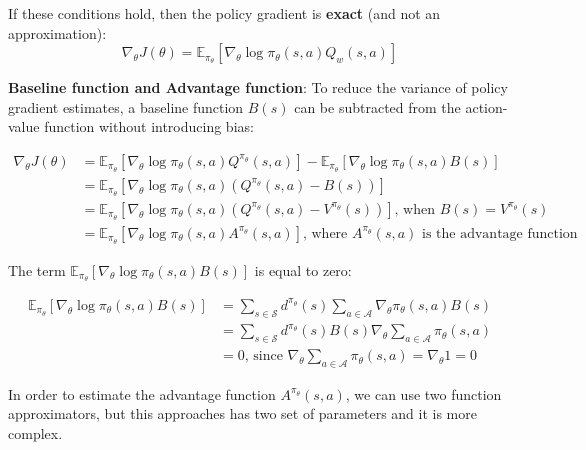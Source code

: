 \noindent If these conditions hold, then the policy gradient is \textbf{exact} (and not an approximation):
\[
    \nabla_\theta J(\theta) = \mathbb{E}_{\pi_\theta}[\nabla_\theta \log \pi_\theta(s,a) Q_w(s,a)]
\]

\noindent \textbf{Baseline function and Advantage function}: To reduce the variance of policy
gradient estimates, a baseline function $B(s)$ can be subtracted from the
action-value function without introducing bias:

\begin{align*}
    \nabla_\theta J(\theta) & = \mathbb{E}_{\pi_\theta}[\nabla_\theta \log \pi_\theta(s,a) Q^{\pi_\theta}(s,a)] - \mathbb{E}_{\pi_\theta}[\nabla_\theta \log \pi_\theta(s,a) B(s)]    \\
                            & = \mathbb{E}_{\pi_\theta}[\nabla_\theta \log \pi_\theta(s,a) (Q^{\pi_\theta}(s,a) - B(s))]                                                              \\
                            & = \mathbb{E}_{\pi_\theta}[\nabla_\theta \log \pi_\theta(s,a) (Q^{\pi_\theta}(s,a) - V^{\pi_\theta}(s))] \text{, when } B(s) =  V^{\pi_\theta}(s)        \\
                            & = \mathbb{E}_{\pi_\theta}[\nabla_\theta \log \pi_\theta(s,a) A^{\pi_\theta}(s,a)] \text{, where } A^{\pi_\theta}(s,a) \text{ is the advantage function}
\end{align*}

\noindent The term $\mathbb{E}_{\pi_\theta}[\nabla_\theta \log \pi_\theta(s,a) B(s)]$ is equal to zero:

\begin{align*}
    \mathbb{E}_{\pi_\theta}[\nabla_\theta \log \pi_\theta(s,a) B(s)] & = \sum_{s \in \mathcal{S}} d^{\pi_\theta}(s) \sum_{a \in \mathcal{A }} \nabla_\theta \pi_\theta(s, a) B(s) \\
                                                                     & = \sum_{s \in \mathcal{S}} d^{\pi_\theta}(s) B(s) \nabla_\theta \sum_{a \in \mathcal{A}} \pi_\theta(s, a)  \\
                                                                     & = 0 \text{, since } \nabla_\theta \sum_{a \in \mathcal{A}} \pi_\theta(s, a) = \nabla_\theta 1 = 0
\end{align*}

\noindent In order to estimate the advantage function $A^{\pi_\theta}(s,a)$, we can use
two function approximators, but this approaches has two set of parameters and
it is more complex.

